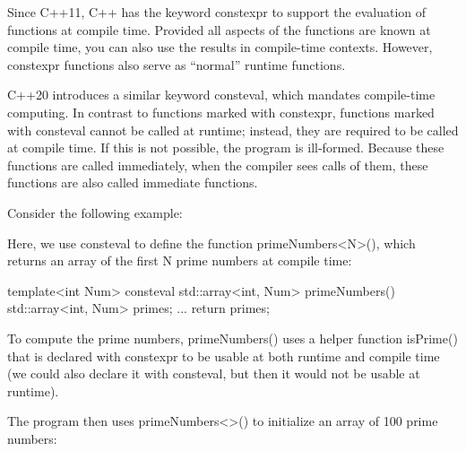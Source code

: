 
Since C++11, C++ has the keyword constexpr to support the evaluation of functions at compile time. Provided all aspects of the functions are known at compile time, you can also use the results in compile-time contexts. However, constexpr functions also serve as “normal” runtime functions.

C++20 introduces a similar keyword consteval, which mandates compile-time computing. In contrast to functions marked with constexpr, functions marked with consteval cannot be called at runtime; instead, they are required to be called at compile time. If this is not possible, the program is ill-formed. Because these functions are called immediately, when the compiler sees calls of them, these functions are also called immediate functions.


Consider the following example:



Here, we use consteval to define the function primeNumbers<N>(), which returns an array of the first N prime numbers at compile time:

\begin{cpp}
template<int Num>
consteval
std::array<int, Num> primeNumbers()
{
	std::array<int, Num> primes;
	...
	return primes;
}
\end{cpp}

To compute the prime numbers, primeNumbers() uses a helper function isPrime() that is declared with constexpr to be usable at both runtime and compile time (we could also declare it with consteval, but then it would not be usable at runtime).

The program then uses primeNumbers<>() to initialize an array of 100 prime numbers:

